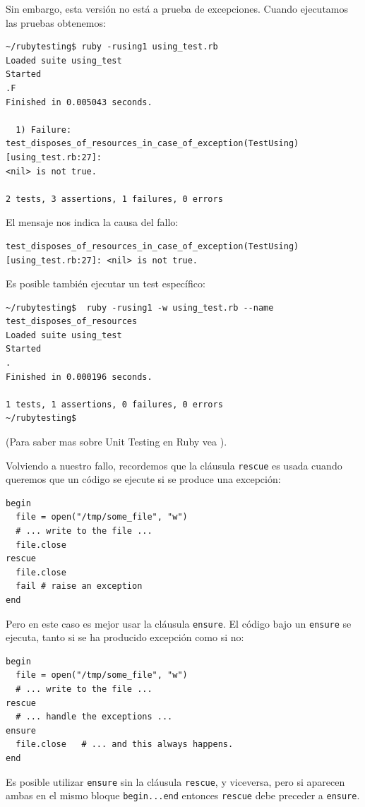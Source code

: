 Sin embargo, esta versión no está a prueba de excepciones. Cuando ejecutamos las pruebas 
obtenemos:
\begin{verbatim}
~/rubytesting$ ruby -rusing1 using_test.rb 
Loaded suite using_test
Started
.F
Finished in 0.005043 seconds.

  1) Failure:
test_disposes_of_resources_in_case_of_exception(TestUsing) [using_test.rb:27]:
<nil> is not true.

2 tests, 3 assertions, 1 failures, 0 errors

\end{verbatim}
El mensaje nos indica la causa del fallo:
\begin{verbatim}
test_disposes_of_resources_in_case_of_exception(TestUsing) [using_test.rb:27]: <nil> is not true.
\end{verbatim}
Es posible también ejecutar un test específico:
\begin{verbatim}
~/rubytesting$  ruby -rusing1 -w using_test.rb --name test_disposes_of_resources
Loaded suite using_test
Started
.
Finished in 0.000196 seconds.

1 tests, 1 assertions, 0 failures, 0 errors
~/rubytesting$ 
\end{verbatim}
(Para saber mas sobre Unit Testing en Ruby vea 
).

Volviendo a nuestro fallo, recordemos que
la cláusula \verb|rescue| es usada cuando queremos que un código se ejecute si se produce una excepción:
\begin{verbatim}
begin
  file = open("/tmp/some_file", "w")
  # ... write to the file ...
  file.close
rescue
  file.close
  fail # raise an exception
end
\end{verbatim}
Pero en este caso es mejor usar la cláusula \verb|ensure|.
El código bajo un \verb|ensure| se ejecuta, tanto si se ha producido excepción como si no:

\begin{verbatim}
begin
  file = open("/tmp/some_file", "w")
  # ... write to the file ...
rescue
  # ... handle the exceptions ...
ensure
  file.close   # ... and this always happens.
end
\end{verbatim}
Es posible utilizar \verb|ensure| sin la cláusula \verb|rescue|, y viceversa,
pero si aparecen ambas en el mismo bloque \verb|begin...end|
entonces \verb|rescue| debe preceder a \verb|ensure|.

